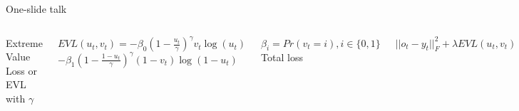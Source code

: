 \documentclass{beamer}
\begin{document}
\begin{frame}{One-slide talk}
\begin{columns}[c]
\end{columns}
\bigskip
\begin{columns}[c]
\qquad Extreme Value Loss or EVL with $\gamma$
\bigskip


 $\textit{EVL}(u_t,v_t) = -\beta_0 \left( 1 - \frac{u_t}{\gamma}\right)^\gamma v_t\log(u_t) $  
 $ -\beta_1 \left( 1 - \frac{1 - u_t}{\gamma}\right)^\gamma (1-v_t)\log(1 - u_t) $ 


\bigskip
\qquad $\beta_i = Pr(v_t = i ),  i \in \{0,1\}$
Total loss

$  ||o_t - y_t||^2_F +  \lambda \textit{EVL}(u_t, v_t)$

\bigskip
$o_t$ - predicted feature map $u_t$ - predicted class map 
\qquad $\lambda$ - hyperparameter

\end{columns}
\end{frame}


\end{document}
